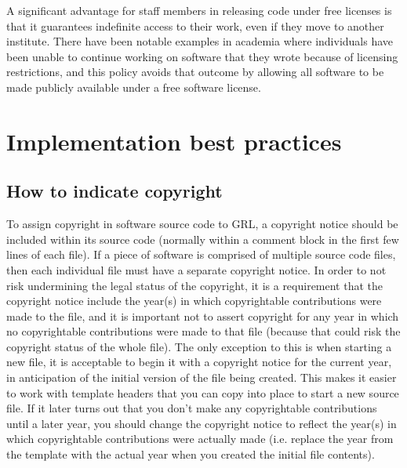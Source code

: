 \documentclass[10pt,a4paper]{article}
\begin{document}
\par A significant advantage for staff members in releasing code under free licenses 
is that it guarantees indefinite access to their work, even if they move to another institute. 
There have been notable examples in academia where individuals have been unable 
to continue working on software that they wrote because of licensing restrictions, and 
this policy avoids that outcome by allowing all software to be made publicly available 
under a free software license. 







\section{Implementation best practices}

%




\subsection{How to indicate copyright}
\par To assign copyright in software source code to GRL, a copyright notice should 
be included within its source code (normally within a comment block in the first 
few lines of each file). If a piece of software is comprised of multiple source code 
files, then each individual file must have a separate copyright notice. In order to 
not risk undermining the legal status of the copyright, it is a requirement that the 
copyright notice include the year(s) in which copyrightable contributions were 
made to the file, and it is important not to assert copyright for any year in which 
no copyrightable contributions were made to that file (because that could risk the 
copyright status of the whole file). The only exception to this is when starting a 
new file, it is acceptable to begin it with a copyright notice for the current year, in 
anticipation of the initial version of the file being created. This makes it easier to 
work with template headers that you can copy into place to start a new source 
file. If it later turns out that you don't make any copyrightable contributions until 
a later year, you should change the copyright notice to reflect the year(s) in which 
copyrightable contributions were actually made (i.e. replace the year from the 
template with the actual year when you created the initial file contents). 
\end{document}
